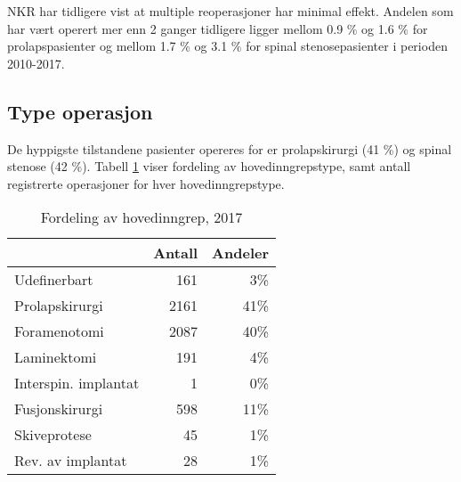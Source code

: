\documentclass [norsk,a4paper,twoside]{article}\usepackage[]{graphicx}\usepackage[]{color}
\begin{document}
NKR har tidligere vist at multiple reoperasjoner har minimal effekt. Andelen som har vært operert mer enn 2 ganger tidligere ligger mellom 0.9 \%
og 1.6 \% for prolapspasienter og mellom 1.7 \%
og 3.1 \% for spinal stenosepasienter i perioden 2010-2017. 



\subsection{Type operasjon}



De hyppigste tilstandene pasienter opereres for er prolapskirurgi (41 \%) og spinal stenose (42 \%). Tabell \ref{tab:AntHovedInngrep} viser fordeling av hovedinngrepstype, samt antall registrerte operasjoner for hver hovedinngrepstype.

\begin{table}[ht]
\centering
\begin{tabular}{lrr}
  \hline
 & Antall & Andeler \\ 
  \hline
Udefinerbart & 161 & 3\% \\ 
  Prolapskirurgi & 2161 & 41\% \\ 
  Foramenotomi & 2087 & 40\% \\ 
  Laminektomi & 191 & 4\% \\ 
  Interspin. implantat & 1 & 0\% \\ 
  Fusjonskirurgi & 598 & 11\% \\ 
  Skiveprotese & 45 & 1\% \\ 
  Rev. av implantat & 28 & 1\% \\ 
   \hline
\end{tabular}
\caption{Fordeling av hovedinngrep, 2017} 
\label{tab:AntHovedInngrep}
\end{table}



\end{document}
